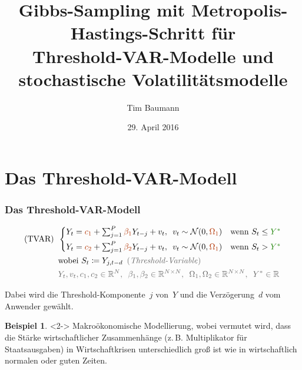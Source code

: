 \documentclass[10pt]{beamer}
\title{Gibbs-Sampling mit Metropolis-Hastings-Schritt für \\ Threshold-VAR-Modelle und \\ stochastische Volatilitätsmodelle}
\institute{\href{http://timbaumann.info/gibbs-her}{timbaumann.info/gibbs-her}}
\author{Tim Baumann}
\date{29. April 2016}
\theoremstyle{definition}
\newtheorem*{bsp}{Beispiel}
\newcommand{\R}{\mathbb{R}} %
\newcommand{\Normal}{\mathcal{N}} %
\newcommand{\stepOne}[1]{\textcolor{StepOneColor}{#1}}
\newcommand{\stepTwo}[1]{\textcolor{StepTwoColor}{#1}}
\newcommand{\typeInfo}[1]{\textcolor{TypeInfoColor}{#1}}
\begin{document}
\begin{frame}
  \titlepage
\end{frame}

\begin{frame}
  \tableofcontents
\end{frame}


\section[Threshold-VAR-Modell]{Das Threshold-VAR-Modell}

\begin{frame}[t]
  \frametitle{Das Threshold-VAR-Modell}

  \begin{modelbox}
    \begin{align*}
      \text{(TVAR)} \enspace
      & \begin{cases}
        Y_t = \stepOne{c_1} + \sum_{j=1}^P \stepOne{\beta_1} Y_{t-j} + v_t, \enspace
        v_t \sim \Normal(0, \stepOne{\Omega_1})
        & \text{wenn } S_t \leq \stepTwo{Y^*} \\[4pt]
        Y_t = \stepOne{c_2} + \sum_{j=1}^P \stepOne{\beta_2} Y_{t-j} + v_t, \enspace
        v_t \sim \Normal(0, \stepOne{\Omega_1})
        & \text{wenn } S_t > \stepTwo{Y^*}
      \end{cases} \\
      & \text{wobei } S_t \coloneqq Y_{j, t-d} \enspace \text{\typeInfo{(\emph{Threshold-Variable})}} \\
      & \typeInfo{
        Y_t, v_t, c_1, c_2 \in \R^N, \enspace
        \beta_1, \beta_2 \in \R^{N \times N}, \enspace
        \Omega_1, \Omega_2 \in \R^{N \times N}, \enspace
        Y^* \in \R
      }
    \end{align*}
  \end{modelbox}

  Dabei wird die Threshold-Komponente~$j$ von~$Y$ und die Verzögerung~$d$ vom Anwender gewählt.

  \begin{bsp}<2->
    Makroökonomische Modellierung, wobei vermutet wird, dass die Stärke wirtschaftlicher Zusammenhänge (z.\,B. Multiplikator für Staatsausgaben) in Wirtschaftkrisen unterschiedlich groß ist wie in wirtschaftlich normalen oder guten Zeiten.
  \end{bsp}
\end{frame}
\end{document}
